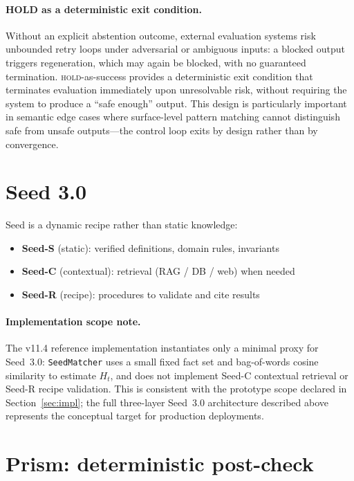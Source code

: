 \documentclass[11pt,a4paper]{article}
\begin{document}
\paragraph{HOLD as a deterministic exit condition.}
Without an explicit abstention outcome, external evaluation systems risk unbounded
retry loops under adversarial or ambiguous inputs: a blocked output triggers
regeneration, which may again be blocked, with no guaranteed termination.
\textsc{hold}-as-success provides a deterministic exit condition that terminates
evaluation immediately upon unresolvable risk, without requiring the system to
produce a ``safe enough'' output. This design is particularly important in
semantic edge cases where surface-level pattern matching cannot distinguish
safe from unsafe outputs---the control loop exits by design rather than by
convergence.

\section{Seed 3.0}
\label{sec:seed}

Seed is a dynamic recipe rather than static knowledge:
\begin{itemize}
\item \textbf{Seed-S} (static): verified definitions, domain rules, invariants
\item \textbf{Seed-C} (contextual): retrieval (RAG / DB / web) when needed
\item \textbf{Seed-R} (recipe): procedures to validate and cite results
\end{itemize}

\paragraph{Implementation scope note.}
The v11.4 reference implementation instantiates only a minimal proxy for Seed~3.0:
\texttt{SeedMatcher} uses a small fixed fact set and bag-of-words cosine similarity
to estimate $H_t$, and does not implement Seed-C contextual retrieval or Seed-R
recipe validation.
This is consistent with the prototype scope declared in Section~\ref{sec:impl};
the full three-layer Seed~3.0 architecture described above represents the
conceptual target for production deployments.

\section{Prism: deterministic post-check}
\label{sec:prism}
\end{document}
